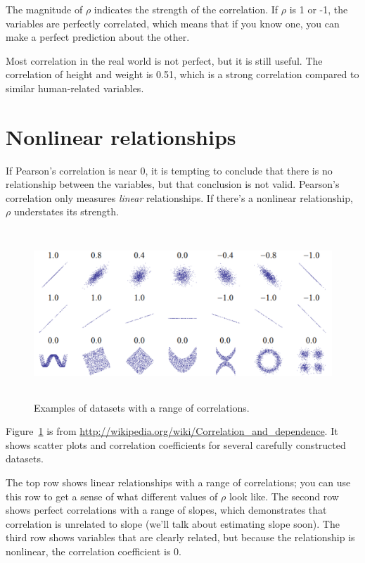 \documentclass[12pt]{book}
\theoremstyle{exercise}
\begin{document}
The magnitude of $\rho$ indicates the strength of the correlation.  If
$\rho$ is 1 or -1, the variables are perfectly correlated, which means
that if you know one, you can make a perfect prediction about the
other.%

Most correlation in the real world is not perfect, but it is still
useful.  The correlation of height and weight is 0.51, which is a
strong correlation compared to similar human-related variables.


\section{Nonlinear relationships}

If Pearson's correlation is near 0, it is tempting to conclude
that there is no relationship between the variables, but that
conclusion is not valid.  Pearson's correlation only measures {\em
  linear\/} relationships.  If there's a nonlinear relationship, $\rho$
understates its strength.%
%
%

\begin{figure}
\centerline{\includegraphics[height=2.5in]{figs/Correlation_examples.png}}
\caption{Examples of datasets with a range of correlations.}%
\label{corr_examples}
\end{figure}

Figure~\ref{corr_examples} is from
\url{http://wikipedia.org/wiki/Correlation_and_dependence}.  It shows
scatter plots and correlation coefficients for several
carefully constructed datasets.%
%

The top row shows linear relationships with a range of correlations;
you can use this row to get a sense of what different values of
$\rho$ look like.  The second row shows perfect correlations with a
range of slopes, which demonstrates that correlation is unrelated to
slope (we'll talk about estimating slope soon).  The third row shows
variables that are clearly related, but because the relationship is
nonlinear, the correlation coefficient is 0.%
\end{document}
